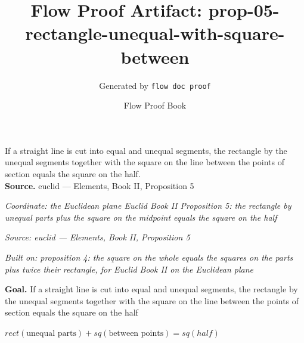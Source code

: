 \documentclass[11pt]{article}
\title{Flow Proof Artifact: prop-05-rectangle-unequal-with-square-between}
\author{Generated by \texttt{flow doc proof}}
\date{Flow Proof Book}
\theoremstyle{definition}
\begin{document}
\maketitle
If a straight line is cut into equal and unequal segments, the rectangle by the unequal segments together with the square on the line between the points of section equals the square on the half.\\[0.5em]
\textbf{Source.} euclid — Elements, Book II, Proposition 5\\[0.5em]
\bigskip
{}\par
\smallskip\noindent\textit{Coordinate: the Euclidean plane \cdot Euclid Book II \cdot Proposition 5: the rectangle by unequal parts plus the square on the midpoint equals the square on the half}\par
\smallskip\noindent\textit{Source: euclid — Elements, Book II, Proposition 5}\par
\smallskip\noindent\textit{Built on: proposition 4: the square on the whole equals the squares on the parts plus twice their rectangle, for Euclid Book II on the Euclidean plane}\par
\medskip
\noindent\textbf{Goal.} If a straight line is cut into equal and unequal segments, the rectangle by the unequal segments together with the square on the line between the points of section equals the square on the half\par
\noindent$\displaystyle rect(\text{unequal parts}) + sq(\text{between points}) = sq(half)$\par
\medskip
\noindent
\end{document}
